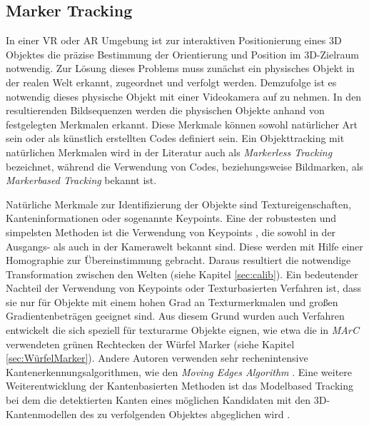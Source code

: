 \subsection{Marker Tracking} \label{sec:MarkerTracking}
In einer VR oder AR Umgebung ist zur interaktiven Positionierung eines 3D Objektes die präzise Bestimmung der Orientierung und Position im 3D-Zielraum notwendig. Zur Lösung dieses Problems muss zunächst ein physisches Objekt in der realen Welt erkannt, zugeordnet und verfolgt werden. Demzufolge ist es notwendig dieses physische Objekt mit einer Videokamera auf zu nehmen. In den resultierenden Bildsequenzen werden die physischen Objekte anhand von festgelegten Merkmalen erkannt. Diese Merkmale können sowohl natürlicher Art sein oder als künstlich erstellten Codes definiert sein. Ein Objekttracking mit natürlichen Merkmalen wird in der Literatur auch als \textit{Markerless Tracking} bezeichnet, während die Verwendung von Codes, beziehungsweise Bildmarken, als \textit{Markerbased Tracking} bekannt ist.

Natürliche Merkmale zur Identifizierung der Objekte sind Textureigenschaften, Kanteninformationen oder sogenannte Keypoints. Eine der robustesten und simpelsten Methoden ist die Verwendung von Keypoints \cite{article:MarkerLessBarandiaran2010}\cite{article:MarkerLessWagner:}\cite{article:MarkerLessComport}\cite{article:MarkerLessLowe}, die sowohl in der Ausgangs- als auch in der Kamerawelt bekannt sind. Diese werden mit Hilfe einer Homographie zur Übereinstimmung gebracht. Daraus resultiert die notwendige Transformation zwischen den Welten (siehe Kapitel \ref{sec:calib}). Ein bedeutender Nachteil der Verwendung von Keypoints oder Texturbasierten Verfahren ist, dass sie nur für Objekte mit einem hohen Grad an Texturmerkmalen und großen Gradientenbeträgen geeignet sind. Aus diesem Grund wurden auch Verfahren \cite{article:MarkerLessStrucktHinterstoisser}\cite{article:MarkerLessStrucktDamen}\cite{article:MarkerLessStrucktPark} entwickelt die sich speziell für texturarme Objekte eignen, wie etwa die in \textit{MArC} verwendeten grünen Rechtecken der Würfel Marker (siehe Kapitel \ref{sec:WürfelMarker}). Andere Autoren verwenden sehr rechenintensive Kantenerkennungsalgorithmen, wie den \textit{Moving Edges Algorithm} \cite{article:MarkerLessEdgeMarchand}. Eine weitere Weiterentwicklung der Kantenbasierten Methoden ist das Modelbased Tracking bei dem die detektierten Kanten eines möglichen Kandidaten mit den 3D-Kantenmodellen des zu verfolgenden Objektes abgeglichen wird \cite{article:MarkerLessModellVacchetti}\cite{article:MarkerLessEdgeAlvarez}\cite{article:MarkerLessEdgeWu}\cite{article:MarkerLessBlasko}.

